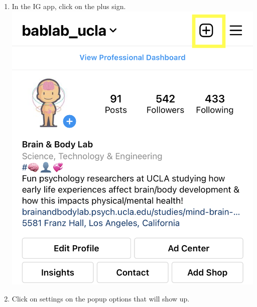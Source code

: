 \documentclass[]{book}
\begin{document}
\begin{enumerate}
\def\labelenumi{\arabic{enumi}.}
\item
  In the IG app, click on the plus sign.
  \includegraphics{images/lab_protocols/ig_pay/ig_1.png}
\item
  Click on settings on the popup options that will show up.

\end{enumerate}
\end{document}
